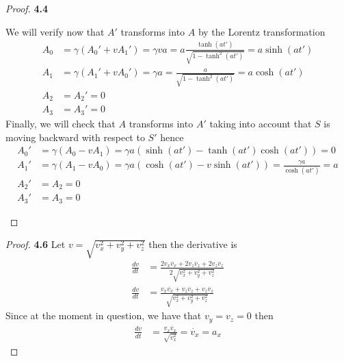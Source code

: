 \documentclass[11pt]{article}
\theoremstyle{definition}
\begin{document}
\begin{proof}{\textbf{4.4}}
\begin{itemize}
    We will verify now that $A'$ transforms into $A$ by the
    Lorentz transformation
    \begin{align*}
        A_0 &= \gamma(A_0' + vA_1') = \gamma va
        = a \frac{\tanh(at')}{\sqrt{1 - \tanh^2(at')}} = a \sinh(at')\\
        A_1 &= \gamma(A_1' + vA_0') = \gamma a
        = \frac{a}{\sqrt{1 - \tanh^2(at')}} = a\cosh(at')\\
        A_2 &= A_2' = 0\\
        A_3 &= A_3' = 0
    \end{align*}
    Finally, we will check that $A$ transforms into $A'$ taking into account
    that $S$ is moving backward with respect to $S'$ hence
    \begin{align*}
        A_0' &= \gamma(A_0 - vA_1) = \gamma a(\sinh(at') - \tanh(at')\cosh(at')) = 0\\
        A_1' &= \gamma(A_1 - vA_0) = \gamma a(\cosh(at') - v\sinh(at'))
        = \frac{\gamma a}{\cosh(at')} = a\\ 
        A_2' &= A_2 = 0\\
        A_3' &= A_3 = 0
    \end{align*}
\end{itemize}
\end{proof}
\begin{proof}{\textbf{4.6}}
    Let $v = \sqrt{v_x^2 + v_y^2 + v_z^2}$ then the derivative is
    \begin{align*}
        \frac{dv}{dt} &= \frac{2v_x\dot{v_x} + 2v_z\dot{v_z} +2v_z\dot{v_z}}
        {2\sqrt{v_x^2 + v_y^2 + v_z^2}}\\
        \frac{dv}{dt} &= \frac{v_x\dot{v_x} + v_z\dot{v_z} +v_z\dot{v_z}}
        {\sqrt{v_x^2 + v_y^2 + v_z^2}}
    \end{align*}
    Since at the moment in question, we have that $v_y = v_z = 0$ then
    \begin{align*}
        \frac{dv}{dt} &= \frac{v_x\dot{v_x}}{\sqrt{v_x^2}}
        = \dot{v_x} = a_x
    \end{align*}
\end{proof}
\cleardoublepage
\end{document}
